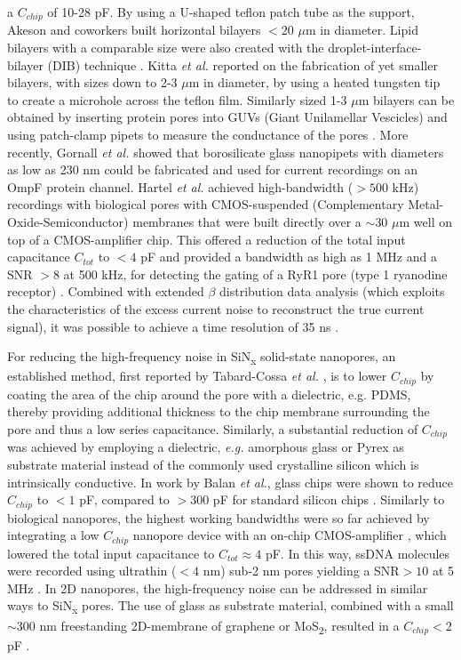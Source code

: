 \noindent a $C_{chip}$ of 10-28 pF. By using a U-shaped teflon patch tube as the support, Akeson and coworkers \cite{Akeson2009,Butler2008} built horizontal bilayers $<20$ $\mu$m in diameter. Lipid bilayers with a comparable size were also created with the droplet-interface-bilayer (DIB) technique \cite{Bayley2008}. Kitta \emph{et al.} \cite{Kitta2009} reported on the fabrication of yet smaller bilayers, with sizes down to 2-3 $\mu$m in diameter, by using a heated tungsten tip to create a microhole across the teflon film. 
Similarly sized 1-3 $\mu$m bilayers can be obtained by inserting protein pores into GUVs (Giant Unilamellar Vescicles) and using patch-clamp pipets to measure the conductance of the pores \cite{Criado1987,Riquelme1990}. More recently, Gornall \emph{et al.} \cite{Gornall2011} showed that borosilicate glass nanopipets with diameters as low as 230 nm could be fabricated and used for current recordings on an OmpF protein channel. Hartel \emph{et al.} \cite{Hartel2018} achieved high-bandwidth ($>500$ kHz) recordings with biological pores with CMOS-suspended (Complementary Metal-Oxide-Semiconductor) membranes that were built directly over a $\sim$30 $\mu$m well on top of a CMOS-amplifier chip. This offered a reduction of the total input capacitance $C_{tot}$ to $<4$ pF and provided a bandwidth as high as 1 MHz and a SNR $>8$  at 500 kHz, for detecting the gating of a RyR1 pore (type 1 ryanodine receptor) \cite{Hartel2018}. Combined with extended $\beta$ distribution data analysis \cite{Schroeder2015} (which exploits the characteristics of the excess current noise to reconstruct the true current signal), it was possible to achieve a time resolution of 35 ns \cite{Hartel2018}. 


For reducing the high-frequency noise in SiN\textsubscript{x} solid-state nanopores, an established method, first reported by Tabard-Cossa \emph{et al.} \cite{Tabard-Cossa2007}, is to lower $C_{chip}$ by coating the area of the chip around the pore with a dielectric, e.g. PDMS, thereby providing additional thickness to the chip membrane surrounding the pore and thus a low series capacitance. Similarly, a substantial reduction of $C_{chip}$ was achieved by employing a dielectric, \emph{e.g.} amorphous glass \cite{Balan2014,Balan2015} or Pyrex \cite{Park2016,Pitchford2015} as substrate material instead of the commonly used crystalline silicon which is intrinsically conductive. In work by Balan \emph{et al.}, \cite{Balan2015} glass chips were shown to reduce $C_{chip}$ to $<1$ pF, compared to $>300$ pF for standard silicon chips \cite{Smeets2008}. Similarly to biological nanopores, the highest working bandwidths were so far achieved by integrating a low $C_{chip}$ nanopore device with an on-chip CMOS-amplifier \cite{Rosenstein2012,Shekar2016}, which lowered the total input capacitance to $C_{tot}\approx 4$ pF. In this way, ssDNA molecules were recorded using ultrathin ($<4$ nm) sub-2 nm pores yielding a SNR$>10$ at 5 MHz \cite{Shekar2016}. In 2D nanopores, the high-frequency noise can be addressed in similar ways to SiN\textsubscript{x} pores. The use of glass as substrate material, combined with a small $\sim$300 nm freestanding 2D-membrane of graphene or MoS\textsubscript{2}, resulted in a $C_{chip}<2$ pF \cite{Balan2015}. 


